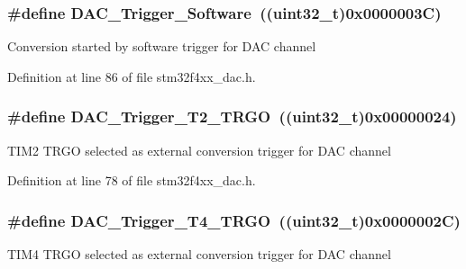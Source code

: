 \hypertarget{group___d_a_c__trigger__selection_gadef77bb8bbd109232900902402ef637f}{
\subsubsection[{D\-A\-C\-\_\-\-Trigger\-\_\-\-Software}]{\setlength{\rightskip}{0pt plus 5cm}\#define D\-A\-C\-\_\-\-Trigger\-\_\-\-Software~((uint32\-\_\-t)0x0000003\-C)}}\label{group___d_a_c__trigger__selection_gadef77bb8bbd109232900902402ef637f}
Conversion started by software trigger for D\-A\-C channel 

Definition at line 86 of file stm32f4xx\-\_\-dac.\-h.

\hypertarget{group___d_a_c__trigger__selection_ga3bfbff1e03af1fd17a57a43e57420fe6}{
\subsubsection[{D\-A\-C\-\_\-\-Trigger\-\_\-\-T2\-\_\-\-T\-R\-G\-O}]{\setlength{\rightskip}{0pt plus 5cm}\#define D\-A\-C\-\_\-\-Trigger\-\_\-\-T2\-\_\-\-T\-R\-G\-O~((uint32\-\_\-t)0x00000024)}}\label{group___d_a_c__trigger__selection_ga3bfbff1e03af1fd17a57a43e57420fe6}
T\-I\-M2 T\-R\-G\-O selected as external conversion trigger for D\-A\-C channel 

Definition at line 78 of file stm32f4xx\-\_\-dac.\-h.

\hypertarget{group___d_a_c__trigger__selection_ga58ccb2de3d22d66ee975152f5edb330a}{
\subsubsection[{D\-A\-C\-\_\-\-Trigger\-\_\-\-T4\-\_\-\-T\-R\-G\-O}]{\setlength{\rightskip}{0pt plus 5cm}\#define D\-A\-C\-\_\-\-Trigger\-\_\-\-T4\-\_\-\-T\-R\-G\-O~((uint32\-\_\-t)0x0000002\-C)}}\label{group___d_a_c__trigger__selection_ga58ccb2de3d22d66ee975152f5edb330a}
T\-I\-M4 T\-R\-G\-O selected as external conversion trigger for D\-A\-C channel 

